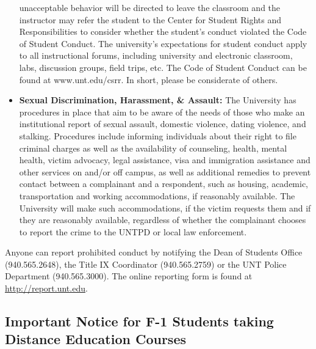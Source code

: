 \documentclass[12pt,]{article}
\begin{document}
\begin{itemize}
  unacceptable behavior will be directed to leave the classroom and the
  instructor may refer the student to the Center for Student Rights and
  Responsibilities to consider whether the student's conduct violated
  the Code of Student Conduct. The university's expectations for student
  conduct apply to all instructional forums, including university and
  electronic classroom, labs, discussion groups, field trips, etc. The
  Code of Student Conduct can be found at www.unt.edu/csrr. In short,
  please be considerate of others.
\item
  \textbf{Sexual Discrimination, Harassment, \& Assault:} The University
  has procedures in place that aim to be aware of the needs of those who
  make an institutional report of sexual assault, domestic violence,
  dating violence, and stalking. Procedures include informing
  individuals about their right to file criminal charges as well as the
  availability of counseling, health, mental health, victim advocacy,
  legal assistance, visa and immigration assistance and other services
  on and/or off campus, as well as additional remedies to prevent
  contact between a complainant and a respondent, such as housing,
  academic, transportation and working accommodations, if reasonably
  available. The University will make such accommodations, if the victim
  requests them and if they are reasonably available, regardless of
  whether the complainant chooses to report the crime to the UNTPD or
  local law enforcement.
\end{itemize}

Anyone can report prohibited conduct by notifying the Dean of Students
Office (940.565.2648), the Title IX Coordinator (940.565.2759) or the
UNT Police Department (940.565.3000). The online reporting form is found
at \url{http://report.unt.edu}.

\hypertarget{important-notice-for-f-1-students-taking-distance-education-courses}{%
\subsection{Important Notice for F-1 Students taking Distance Education
Courses}\label{important-notice-for-f-1-students-taking-distance-education-courses}}
\end{document}
